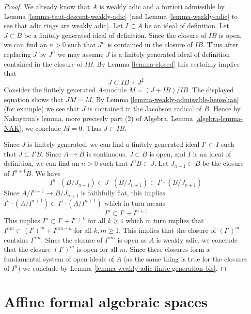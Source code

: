 \begin{proof}
We already know that $A$ is weakly adic and a fortiori admissible by
Lemma \ref{lemma-taut-descent-weakly-adic} (and Lemma \ref{lemma-weakly-adic}
to see that adic rings are weakly adic).
Let $I \subset A$ be an ideal of definition.
Let $J \subset B$ be a finitely generated ideal of definition.
Since the closure of $IB$ is open, we can find an $n > 0$ such that
$J^n$ is contained in the closure of $IB$. Thus after replacing $J$
by $J^n$ we may assume $J$ is a finitely generated ideal
of definition contained in the closure of $IB$. By Lemma \ref{lemma-closed}
this certainly implies that
$$
J \subset IB + J^2
$$
Consider the finitely generated $A$-module $M = (J + IB)/IB$.
The displayed equation shows that $JM = M$.
By Lemma \ref{lemma-weakly-admissible-henselian} (for example)
we see that $J$ is contained in the Jacobson radical of $B$.
Hence by Nakayama's lemma, more precisely part (2) of
Algebra, Lemma \ref{algebra-lemma-NAK}, we conclude $M = 0$.
Thus $J \subset IB$.

\medskip\noindent
Since $J$ is finitely generated, we can find a finitely generated
ideal $I' \subset I$ such that $J \subset I'B$.
Since $A \to B$ is continuous, $J \subset B$ is open, and
$I$ is an ideal of definition, we can find an $n > 0$ such that
$I^nB \subset J$. Let $J_{n + 1} \subset B$ be the closure of
$I^{n + 1}B$.
We have
$$
I^n \cdot (B/J_{n + 1}) \subset J \cdot (B/J_{n + 1}) \subset
I' \cdot (B/J_{n + 1})
$$
Since $A/I^{n + 1} \to B/J_{n + 1}$ is faithfully flat, this
implies $I^n \cdot (A/I^{n + 1}) \subset I' \cdot (A/I^{n + 1})$
which in turn means
$$
I^n \subset I' + I^{n + 1}
$$
This implies $I^n \subset I'  + I^{n + k}$ for all $k \geq 1$
which in turn implies that $I^{nm} \subset (I')^m + I^{nm + k}$
for all $k, m \geq 1$. This implies that the closure of
$(I')^m$ contains $I^{nm}$. Since the closure of $I^{nm}$ is open
as $A$ is weakly adic,
we conclude that the closure $(I')^m$ is open for all $m$.
Since these closures form a fundamental system of open ideals
of $A$ (as the same thing is true for the closures of $I^n$)
we conclude by Lemma \ref{lemma-weakly-adic-finite-generation-bis}.
\end{proof}









\section{Affine formal algebraic spaces}
\label{section-affine-formal-algebraic-spaces}

